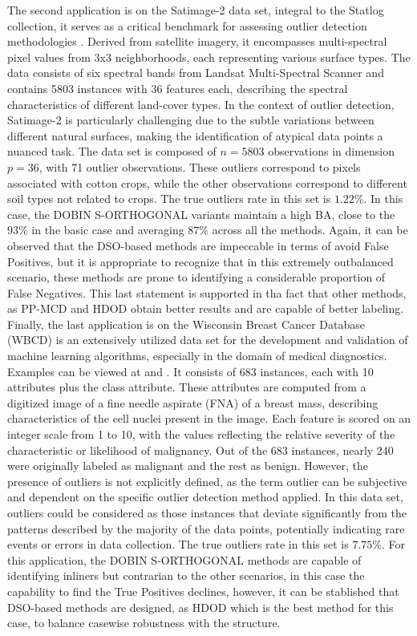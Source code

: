 \documentclass[12pt]{article}
\begin{document}
The second application is on the Satimage-2 data set, integral to the Statlog collection, it serves as a critical benchmark for assessing outlier detection methodologies \citep{Rayana:2016}. Derived from satellite imagery, it encompasses multi-spectral pixel values from 3x3 neighborhoods, each representing various surface types. The data consists of six spectral bands from Landsat Multi-Spectral Scanner and contains 5803 instances with 36 features each, describing the spectral characteristics of different land-cover types. In the context of outlier detection, Satimage-2 is particularly challenging due to the subtle variations between different natural surfaces, making the identification of atypical data points a nuanced task. The data set is composed of $n = 5803$ observations in dimension $p = 36$, with 71 outlier observations. These outliers correspond to pixels associated with cotton crops, while the other observations correspond to different soil types not related to crops. The true outliers rate in this set is $1.22\%$. In this case, the DOBIN S-ORTHOGONAL variants maintain a high BA, close to the $93\%$ in the basic case and averaging $87\%$ across all the methods. Again, it can be observed that the DSO-based methods are impeccable in terms of avoid False Positives, but it is appropriate to recognize that in this extremely outbalanced scenario, these methods are prone to identifying a considerable proportion of False Negatives. This last statement is supported in tha fact that other methods, as PP-MCD and HDOD obtain better results and are capable of better labeling.\\

Finally, the last application is on the Wisconsin Breast Cancer Database (WBCD) \citep{wbcd_data} is an extensively utilized data set for the development and validation of machine learning algorithms, especially in the domain of medical diagnostics. Examples can be viewed at \citep{ting2009mass} and \cite{keller2012hics}. It consists of 683 instances, each with 10 attributes plus the class attribute. These attributes are computed from a digitized image of a fine needle aspirate (FNA) of a breast mass, describing characteristics of the cell nuclei present in the image. Each feature is scored on an integer scale from 1 to 10, with the values reflecting the relative severity of the characteristic or likelihood of malignancy. Out of the 683 instances, nearly 240 were originally labeled as malignant and the rest as benign. However, the presence of outliers is not explicitly defined, as the term outlier can be subjective and dependent on the specific outlier detection method applied. In this data set, outliers could be considered as those instances that deviate significantly from the patterns described by the majority of the data points, potentially indicating rare events or errors in data collection. The true outliers rate in this set is $7.75\%$. For this application, the DOBIN S-ORTHOGONAL methods are capable of identifying inliners but contrarian to the other scenarios, in this case the capability to find the True Positives declines, however, it can be stablished that DSO-based methods are designed, as HDOD which is the best method for this case, to balance casewise robustness with the structure.\\
\end{document}
